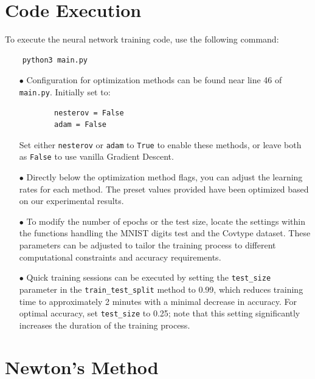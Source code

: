 \documentclass{article}
\begin{document}
\newpage

\section{Code Execution}

To execute the neural network training code, use the following command:
\begin{verbatim}
    python3 main.py
\end{verbatim}

\begin{itemize}
    \item[$\bullet$] Configuration for optimization methods can be found near line 46 of \texttt{main.py}. Initially set to:
    \begin{verbatim}
        nesterov = False
        adam = False
    \end{verbatim}
    Set either \texttt{nesterov} or \texttt{adam} to \texttt{True} to enable these methods, or leave both as \texttt{False} to use vanilla Gradient Descent.

    \item[$\bullet$] Directly below the optimization method flags, you can adjust the learning rates for each method. The preset values provided have been optimized based on our experimental results.

    \item[$\bullet$] To modify the number of epochs or the test size, locate the settings within the functions handling the MNIST digits test and the Covtype dataset. These parameters can be adjusted to tailor the training process to different computational constraints and accuracy requirements.

    \item[$\bullet$] Quick training sessions can be executed by setting the \texttt{test\_size} parameter in the \texttt{train\_test\_split} method to 0.99, which reduces training time to approximately 2 minutes with a minimal decrease in accuracy. For optimal accuracy, set \texttt{test\_size} to 0.25; note that this setting significantly increases the duration of the training process.
\end{itemize}

\section{Newton's Method}
\end{document}
